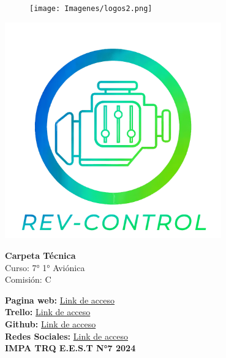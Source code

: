 \documentclass[a4paper,12pt]{report}
\begin{document}

    \begin{titlepage}
        \centering
        \begin{figure}
            \centering
            \texttt{[image: Imagenes/logos2.png]} %
        \end{figure}
        
        \includegraphics[width=0.7\textwidth]{Imagenes/LOGO REV CONTROL OFICIAL2.png} %
        \vspace{1cm}
        
        {\Huge \textbf{\textcolor{celeste_rev}{Carpeta Técnica}\\}}
        \vspace{1cm}
        {\Large \textcolor{verde_rev}{Curso: 7° 1° Aviónica}\\}
        \vspace{0.5cm}
        {\Large \textcolor{celeste_rev}{Comisión: C}\\}
        \vspace{1cm}
    
        \textbf{\textcolor{celeste_rev}{Pagina web:}} \href{https://www.google.com/}{Link de acceso}\\
        \textbf{\textcolor{celeste_rev}{Trello:}} \href{https://trello.com/b/yDSPDlAp/kanban}{Link de acceso}\\
        \textbf{\textcolor{celeste_rev}{Github:}} \href{https://github.com/impatrq/revcontrol}{Link de acceso}\\
        \textbf{\textcolor{celeste_rev}{Redes Sociales:}} \href{https://www.instagram.com/rev.control/}{Link de acceso}\\
        \vfill
        \textbf{\textcolor{celeste_rev}{IMPA TRQ E.E.S.T N°7 2024}}\\
    \end{titlepage}
\end{document}
